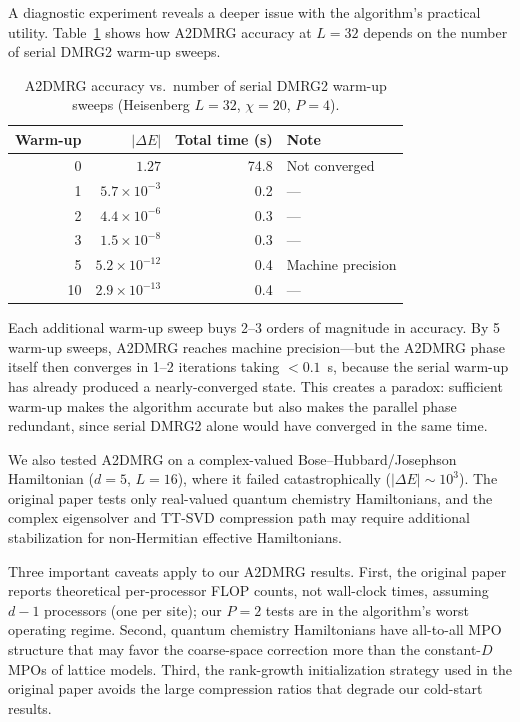 \documentclass[preprint,12pt]{elsarticle}
\begin{document}
A diagnostic experiment reveals a deeper issue with the algorithm's practical utility.
Table~\ref{tab:a2dmrg_warmup} shows how A2DMRG accuracy at $L = 32$ depends on the number of serial DMRG2 warm-up sweeps.

\begin{table}[h]
\centering
\caption{A2DMRG accuracy vs.\ number of serial DMRG2 warm-up sweeps (Heisenberg $L = 32$, $\chi = 20$, $P = 4$).}
\label{tab:a2dmrg_warmup}
\begin{tabular}{rrrl}
\toprule
Warm-up & $|\Delta E|$ & Total time (s) & Note \\
\midrule
0 & $1.27$               & 74.8 & Not converged \\
1 & $5.7 \times 10^{-3}$ & 0.2  & --- \\
2 & $4.4 \times 10^{-6}$ & 0.3  & --- \\
3 & $1.5 \times 10^{-8}$ & 0.3  & --- \\
5 & $5.2 \times 10^{-12}$ & 0.4  & Machine precision \\
10 & $2.9 \times 10^{-13}$ & 0.4  & --- \\
\bottomrule
\end{tabular}
\end{table}

Each additional warm-up sweep buys 2--3 orders of magnitude in accuracy.
By 5 warm-up sweeps, A2DMRG reaches machine precision---but the A2DMRG phase itself then converges in 1--2 iterations taking $< 0.1$~s, because the serial warm-up has already produced a nearly-converged state.
This creates a paradox: sufficient warm-up makes the algorithm accurate but also makes the parallel phase redundant, since serial DMRG2 alone would have converged in the same time.

We also tested A2DMRG on a complex-valued Bose--Hubbard/Josephson Hamiltonian ($d = 5$, $L = 16$), where it failed catastrophically ($|\Delta E| \sim 10^3$).
The original paper tests only real-valued quantum chemistry Hamiltonians, and the complex eigensolver and TT-SVD compression path may require additional stabilization for non-Hermitian effective Hamiltonians.

Three important caveats apply to our A2DMRG results.
First, the original paper reports theoretical per-processor FLOP counts, not wall-clock times, assuming $d - 1$ processors (one per site); our $P = 2$ tests are in the algorithm's worst operating regime.
Second, quantum chemistry Hamiltonians have all-to-all MPO structure that may favor the coarse-space correction more than the constant-$D$ MPOs of lattice models.
Third, the rank-growth initialization strategy used in the original paper avoids the large compression ratios that degrade our cold-start results.
\end{document}
